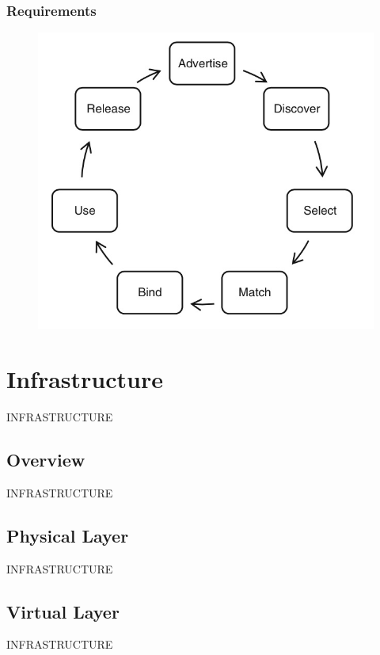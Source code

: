 \documentclass{beamer}
\begin{document}
\begin{frame}
  \frametitle{Requirements}
      \begin{figure}
      \includegraphics[width=\textwidth,height=0.8\textheight,keepaspectratio]{p2p-collab.jpg}
    \end{figure}
\end{frame}

\section{Infrastructure}
\begin{frame}
INFRASTRUCTURE 
\end{frame}  

\subsection{Overview}
\begin{frame}
  INFRASTRUCTURE
\end{frame}

\subsection{Physical Layer}
\begin{frame}
  INFRASTRUCTURE
\end{frame}

\subsection{Virtual Layer}
\begin{frame}
  INFRASTRUCTURE
\end{frame}
\end{document}
